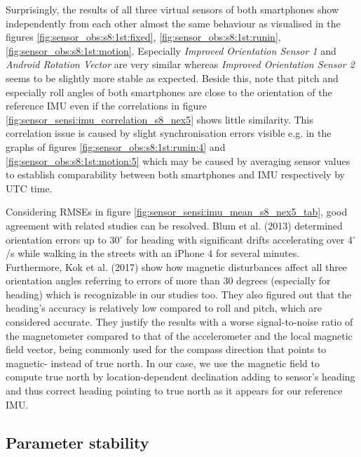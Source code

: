 \documentclass[review]{elsarticle}
\begin{document}
Surprisingly, the results of all three virtual sensors of both smartphones show independently from each other almost the same behaviour as visualised in the figures \ref{fig:sensor_obs:s8:1st:fixed}, \ref{fig:sensor_obs:s8:1st:runin}, \ref{fig:sensor_obs:s8:1st:motion}. Especially \textit{Improved Orientation Sensor 1} and \textit{Android Rotation Vector} are very similar whereas \textit{Improved Orientation Sensor 2} seems to be slightly more stable as expected.
Beside this, note that pitch and especially roll angles of both smartphones are close to the orientation of the reference \gls{IMU} even if the correlations in figure \ref{fig:sensor_sensi:imu_correlation_s8_nex5} shows little similarity. This correlation issue is caused by slight synchronisation errors visible e.g. in the graphs of figures \ref{fig:sensor_obs:s8:1st:runin:4} and \ref{fig:sensor_obs:s8:1st:motion:5} which may be caused by averaging sensor values to establish comparability between both smartphones and \gls{IMU} respectively by UTC time. 

Considering \glspl{RMSE} in figure \ref{fig:sensor_sensi:imu_mean_s8_nex5_tab}, good agreement with related studies can be resolved. Blum et al. (2013) \cite{Blum2013} determined orientation errors up to 30$^\circ$ for heading with significant drifts accelerating over 4$^\circ$/s while walking in the streets with an iPhone 4 for several minutes. Furthermore, Kok et al. (2017) \cite{Kok2017} show how magnetic disturbances affect all three orientation angles referring to errors of more than 30 degrees (especially for heading) which is  recognizable in our studies too. They also figured out that the heading's accuracy is relatively low compared to roll and pitch, which are considered accurate. They justify the results with a worse signal-to-noise ratio of the magnetometer compared to that of the accelerometer and the local magnetic field vector, being commonly used for the compass direction that points to magnetic- instead of true north. In our case, we use the magnetic field to compute true north by location-dependent declination adding to sensor's heading and thus correct heading pointing to true north as it appears for our reference \gls{IMU}. 

\subsection{Parameter stability}
\label{sec:technology:sensors:stability}
\end{document}
